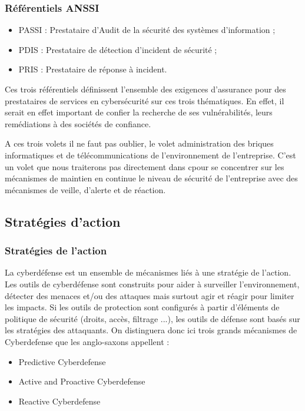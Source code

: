 \begin{frame}
\frametitle<presentation>{Référentiels ANSSI}
\begin{itemize}
\item PASSI : Prestataire d’Audit de la sécurité des systèmes d’information ;
\item PDIS : Prestataire de détection d’incident de sécurité ;
\item PRIS : Prestataire de réponse à incident.
\end{itemize}

Ces trois référentiels définissent l’ensemble des exigences d’assurance pour des prestataires de services en cybersécurité sur ces trois thématiques. En effet, il serait en effet important de confier la recherche de ses vulnérabilités, leurs remédiations à des sociétés de confiance. 
\end{frame}
A ces trois volets il ne faut pas oublier, le volet administration des briques informatiques et de télécommunications de l’environnement de l’entreprise. C’est un volet que nous traiterons pas directement dans c\edoc pour se concentrer sur les mécanismes de maintien en continue le niveau de sécurité de l’entreprise avec des mécanismes de veille, d’alerte et de réaction.


\subsection{Stratégies d'action}

\begin{frame}
\frametitle<presentation>{Stratégies de l'action}

La cyberdéfense est un ensemble de mécanismes liés à une stratégie de l'action. Les outils de cyberdéfense sont construits pour aider à surveiller l'environnement, détecter des menaces et/ou des attaques mais surtout agir et réagir pour limiter les impacts. Si les outils de protection sont configurés à partir d'éléments de politique de sécurité (droits, accès, filtrage ...), les outils de défense sont basés sur les stratégies des attaquants.
On distinguera donc ici trois grands mécanismes de Cyberdefense que les anglo-saxons appellent : 

\begin{itemize}
	\item Predictive Cyberdefense
	\item Active and Proactive Cyberdefense
	\item Reactive Cyberdefense 
\end{itemize}
\end{frame}

